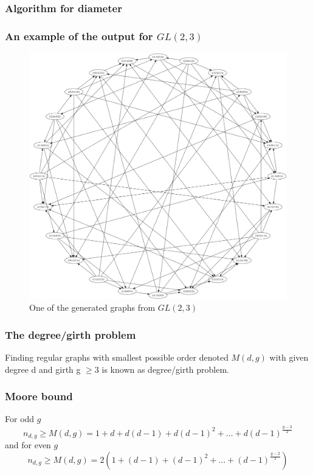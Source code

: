 \documentclass{beamer}
\begin{document}
\begin{frame}
	\frametitle{Algorithm for diameter}
	
\end{frame}
\begin{frame}
	\frametitle{An example of the output for $GL(2,3)$}
	\begin{figure}[!ht]
 		\centering
 		\includegraphics[scale=0.12]{example.png}
		\caption{One of the generated graphs from $GL(2,3)$ }
	\end{figure}
\end{frame}
\begin{frame}
    \frametitle{The degree/girth problem}
    \begin{definition}
        Finding regular graphs with smallest possible order denoted $M(d,g)$ with given degree d and girth g $\geq 3$ is known as degree/girth problem.
    \end{definition}
\end{frame}
\begin{frame}
    \frametitle{Moore bound}
        For odd $g$
        \begin{equation*}
            n_{d,g} \geq M(d,g) = 1 + d + d(d - 1) + d(d - 1)^{2} + \dots + d(d - 1)^{\frac{g-3}{2}}
        \end{equation*}
        and for even $g$
        \begin{equation*}
            n_{d,g} \geq M(d,g) = 2(1 + (d - 1) + (d - 1)^{2} + \dots + (d - 1)^{\frac{g-2}{2}})
        \end{equation*}
\end{frame}
\end{document}
